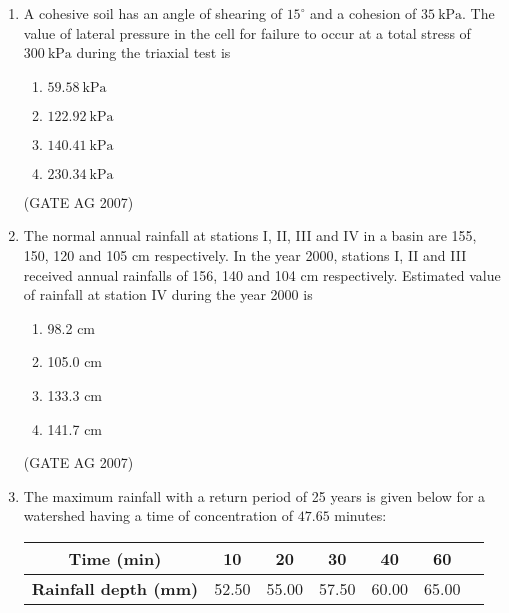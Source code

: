 \documentclass[journal,12pt,onecolumn]{IEEEtran}
\theoremstyle{remark}
\begin{document}
\begin{enumerate}[label=Q\arabic*:]
\begin{multicols}{4}
\begin{enumerate}
\item $0.25\ \text{m}^3\ \text{s}^{-1}$
\item $0.50\ \text{m}^3\ \text{s}^{-1}$
\item $0.65\ \text{m}^3\ \text{s}^{-1}$
\item $0.75\ \text{m}^3\ \text{s}^{-1}$
\end{enumerate}
\end{multicols}
\hfill(GATE AG 2007)


\item A cohesive soil has an angle of shearing of $15^\circ$ and a cohesion of $35\ \text{kPa}$. The value of lateral pressure in the cell for failure to occur at a total stress of $300\ \text{kPa}$ during the triaxial test is

\begin{multicols}{4}
\begin{enumerate}
\item $59.58\ \text{kPa}$
\item $122.92\ \text{kPa}$
\item $140.41\ \text{kPa}$
\item $230.34\ \text{kPa}$
\end{enumerate}
\end{multicols}
\hfill(GATE AG 2007)

\item The normal annual rainfall at stations I, II, III and IV in a basin are 155, 150, 120 and 105 cm respectively. In the year 2000, stations I, II and III received annual rainfalls of 156, 140 and 104 cm respectively. Estimated value of rainfall at station IV during the year 2000 is
\begin{multicols}{4}
\begin{enumerate}
\item 98.2 cm
\item 105.0 cm
\item 133.3 cm
\item 141.7 cm
\end{enumerate}
\end{multicols}
\hfill(GATE AG 2007)

\item The maximum rainfall with a return period of 25 years is given below for a watershed having a time of concentration of $47.65$ minutes:

\begin{table}[H]
\centering
\begin{tabular}{|c|c|c|c|c|c|c|}
\hline
\textbf{Time (min)} & 10 & 20 & 30 & 40 & 60 \\
\hline
\textbf{Rainfall depth (mm)} & 52.50 & 55.00 & 57.50 & 60.00 & 65.00 \\
\hline
\end{tabular}
\end{table}


\end{enumerate}
\end{document}
